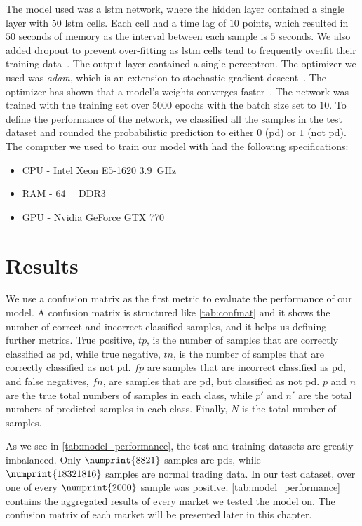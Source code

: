 The model used was a \ac{lstm} network, where the hidden layer contained a single layer with $50$ \ac{lstm} cells. Each cell had a time lag of $10$ points, which resulted in $50$ seconds of memory as the interval between each sample is $5$ seconds. We also added dropout to prevent over-fitting as \ac{lstm} cells tend to frequently overfit their training data~\cite{overfit}. The output layer contained a single perceptron. The optimizer we used was \emph{adam}, which is an extension to stochastic gradient descent~\cite{kingma2014adam}. The optimizer has shown that a model's weights converges faster~\cite{adam}. The network was trained with the training set over $5000$ epochs with the batch size set to $10$. To define the performance of the network, we classified all the samples in the test dataset and rounded the probabilistic prediction to either $0$ (\ac{pd}) or $1$ (not \ac{pd}).
\\
The computer we used to train our model with had the following specifications:
\begin{itemize}
    \item CPU - Intel Xeon E5-1620 \SI{3.9}{\giga\hertz}
    \item RAM - \SI{64}{\gibi\byte} DDR3 
    \item GPU - Nvidia GeForce GTX 770
\end{itemize}

\section{Results}
We use a confusion matrix as the first metric to evaluate the performance of our model. A confusion matrix is structured like \autoref{tab:confmat} and it shows the number of correct and incorrect classified samples, and it helps us defining further metrics. True positive, $tp$, is the number of samples that are correctly classified as \ac{pd}, while true negative, $tn$, is the number of  samples that are correctly classified as not \ac{pd}. $fp$ are samples that are incorrect classified as \ac{pd}, and false negatives, $fn$, are samples that are \ac{pd}, but classified as not \ac{pd}. $p$ and $n$ are the true total numbers of samples in each class, while $p'$ and $n'$ are the total numbers of predicted samples in each class. Finally, $N$ is the total number of samples.




As we see in \autoref{tab:model_performance}, the test and training datasets are greatly imbalanced. Only $\numprint{8821}$ samples are \acp{pd}, while $\numprint{18321816}$ samples are normal trading data. In our test dataset, over one of every $\numprint{2000}$ sample was positive. \autoref{tab:model_performance} contains the aggregated results of every market we tested the model on. The confusion matrix of each market will be presented later in this chapter. 

